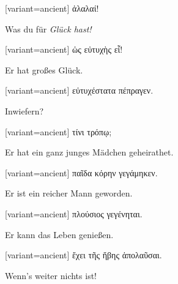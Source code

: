 \switchcolumn

\begin{greek}[variant=ancient]%
ἀλαλαί!

\end{greek}%
\switchcolumn*

Was du für \emph{Glück hast!} 

\switchcolumn

\begin{greek}[variant=ancient]%
ὡς εὐτυχὴς εἶ!

\end{greek}%
\switchcolumn*

Er hat großes Glück. 

\switchcolumn

\begin{greek}[variant=ancient]%
εὐτυχέστατα πέπραγεν.

\end{greek}%
\switchcolumn*

Inwiefern? 

\switchcolumn

\begin{greek}[variant=ancient]%
τίνι τρόπῳ;

\end{greek}%
\switchcolumn*

Er hat ein ganz junges Mädchen geheirathet. 

\switchcolumn

\begin{greek}[variant=ancient]%
παῖδα κόρην γεγάμηκεν.

\end{greek}%
\switchcolumn*

Er ist ein reicher Mann geworden. 

\switchcolumn

\begin{greek}[variant=ancient]%
πλούσιος γεγένηται.

\end{greek}%
\switchcolumn*

Er kann das Leben genießen. 

\switchcolumn

\begin{greek}[variant=ancient]%
ἔχει τῆς ἥβης ἀπολαῦσαι.

\end{greek}%
\switchcolumn*

Wenn's weiter nichts ist! 

\switchcolumn


